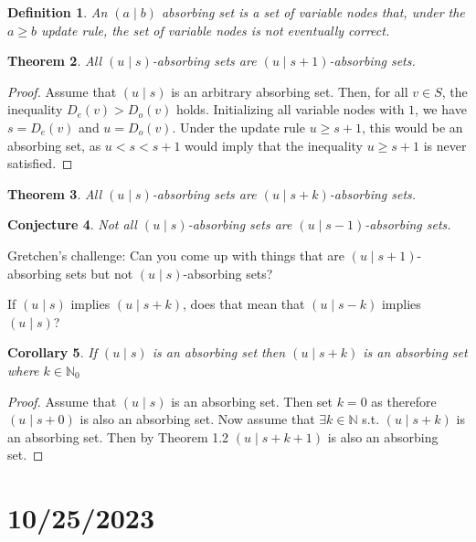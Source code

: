\documentclass{article}
\newtheorem{thm}{Theorem}[section]
\newtheorem{co}[thm]{Corollary}
\newtheorem{conj}[thm]{Conjecture}
\newtheorem{definition}[thm]{Definition}
\begin{document}
\begin{definition}
    An $(a \mid b)$ absorbing set is a set of variable nodes that, under the $a \geq b$ update rule, the set of variable nodes is not eventually correct.
\end{definition}


\begin{thm}
    All $(u\mid s)$-absorbing sets are $(u\mid s+1)$-absorbing sets.
\end{thm}


\begin{proof}


    Assume that $(u \mid s)$ is an arbitrary absorbing set. Then, for all $v \in S$, the inequality $D_e(v) > D_o(v)$ holds. Initializing all variable nodes with $1$, we have $s = D_e(v)$ and $u = D_o(v)$. Under the update rule $u \geq s + 1$, this would be an absorbing set, as $u < s < s + 1$ would imply that the inequality $u \geq s + 1$ is never satisfied.
\end{proof}




\begin{thm}
    All $(u\mid s)$-absorbing sets are $(u\mid s+k)$-absorbing sets.
\end{thm}

\begin{conj}
    Not all $(u\mid s)$-absorbing sets are $(u\mid s-1)$-absorbing sets.
\end{conj}

Gretchen's challenge: Can you come up with things that are $(u \mid s + 1)$-absorbing sets but not $(u \mid s)$-absorbing sets?

If $(u \mid s)$ implies $(u \mid s + k)$, does that mean that $(u \mid s - k)$ implies $(u \mid s)$?


\begin{co}
    If $(u\mid s)$ is an absorbing set then $(u\mid s+k)$ is an absorbing set where $k\in \mathbb{N}_0$
\end{co}

\begin{proof}
    Assume that $(u\mid s)$ is an absorbing set. Then set $k=0$ as therefore $(u\mid s+0)$ is also an absorbing set. Now assume that $\exists k \in \mathbb{N}$ s.t. $(u \mid s +k)$ is an absorbing set. Then by Theorem 1.2 $(u\mid s+k+1)$ is also an absorbing set.
\end{proof}

\section*{10/25/2023}
\end{document}
